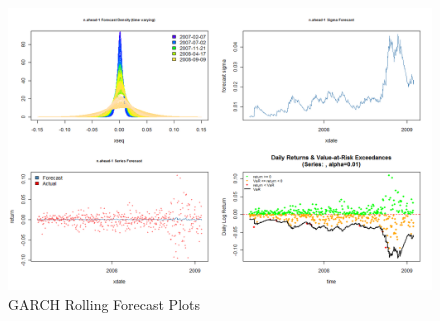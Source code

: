 \begin{figure}
\centering
\includegraphics{roll.png}
\caption[GARCH Rolling Forecast Plots]{GARCH Rolling Forecast Plots}\label{fig:roll}
\end{figure}

